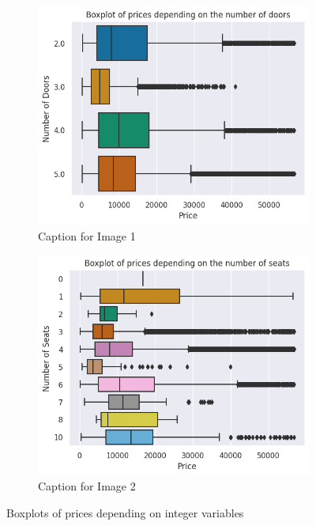 \documentclass[12pt]{article}
\begin{document}
\FloatBarrier
\begin{figure}[ht]
  \centering
  \begin{subfigure}{0.48\textwidth}
    \includegraphics[width=\linewidth]{number of doors.png}
    \caption{Caption for Image 1}
    \label{fig:image1}
  \end{subfigure}
  \hfill
  \begin{subfigure}{0.48\textwidth}
    \includegraphics[width=\linewidth]{number of seats.png}
    \caption{Caption for Image 2}
    \label{fig:image2}
  \end{subfigure}
  \caption{Boxplots of prices depending on integer variables}
  \label{fig:twoimages}
\end{figure}
\FloatBarrier
\end{document}
